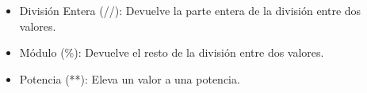 \begin{itemize}
    \item División Entera (//): Devuelve la parte entera de la división entre dos valores.
    \begin{figure}[h]
      \centering
    \end{figure}
    \newpage
    \item Módulo (\%): Devuelve el resto de la división entre dos valores.
    \begin{figure}[h]
      \centering
    \end{figure}

    \item Potencia (**): Eleva un valor a una potencia.
    \begin{figure}[h]
      \centering
    \end{figure}
  \end{itemize}  


